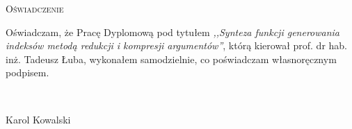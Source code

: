 \newpage
\thispagestyle{empty}


\begin{center}
\LARGE\textsc{Oświadczenie}
\end{center}

\vspace{1cm}

Oświadczam, że Pracę Dyplomową pod tytułem \emph{,,Synteza funkcji generowania indeksów metodą redukcji i kompresji argumentów''}, którą kierował prof. dr hab. inż. Tadeusz Łuba, wykonałem samodzielnie, co poświadczam własnoręcznym podpisem.

\vspace{2cm}

\begin{flushright}
\begin{minipage}{5cm}
	\dotfill \\[-0.7cm]
	\begin{center}
	\small{Karol Kowalski}
	\end{center}
\end{minipage}
\end{flushright}

